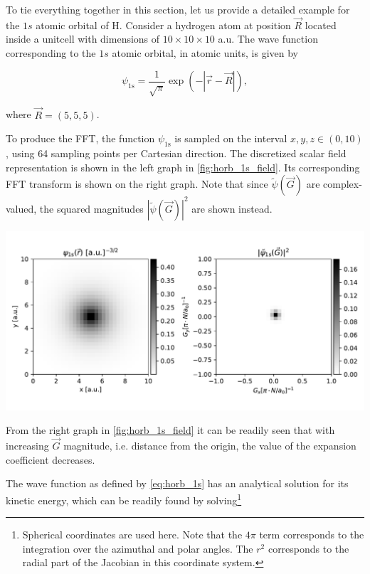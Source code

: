 To tie everything together in this section, let us provide a detailed example for the $1s$ atomic orbital of H. Consider a hydrogen atom at position $\vec{R}$ located inside a unitcell with dimensions of $10 \times 10 \times 10$ a.u. The wave function corresponding to the $1s$ atomic orbital, in atomic units, is given by

\begin{equation}
    \psi_{\text{1s}} = \frac{1}{\sqrt{\pi}} \exp \left( -|\vec{r} - \vec{R}| \right),
    \label{eq:horb_1s}
\end{equation}

where $\vec{R} = (5,5,5)$.

To produce the FFT, the function $\psi_{\text{1s}}$ is sampled on the interval $x,y,z \in (0,10)$, using 64 sampling points per Cartesian direction. The discretized scalar field representation is shown in the left graph in \cref{fig:horb_1s_field}. Its corresponding FFT transform is shown on the right graph. Note that since $\tilde{\psi}(\vec{G})$ are complex-valued, the squared magnitudes $\left|\tilde{\psi}(\vec{G})\right|^{2}$ are shown instead.

\begin{Figure}
    \centering
    \includegraphics[width=\linewidth]{img/horb_1s_fields.pdf}
    \label{fig:horb_1s_field}
\end{Figure}

From the right graph in \cref{fig:horb_1s_field} it can be readily seen that with increasing $\vec{G}$ magnitude, i.e. distance from the origin, the value of the expansion coefficient decreases.

The wave function as defined by \cref{eq:horb_1s} has an analytical solution for its kinetic energy, which can be readily found by solving\footnote{Spherical coordinates are used here. Note that the $4\pi$ term corresponds to the integration over the azimuthal and polar angles. The $r^{2}$ corresponds to the radial part of the Jacobian in this coordinate system.}

